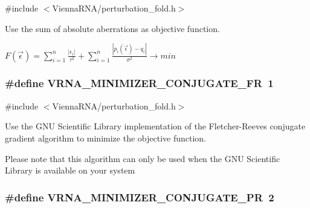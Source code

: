 {\ttfamily \#include $<$Vienna\-R\-N\-A/perturbation\-\_\-fold.\-h$>$}



Use the sum of absolute aberrations as objective function. 

$ F(\vec\epsilon) = \sum_{i = 1}^n{ \frac{|\epsilon_i|}{\tau^2} } + \sum_{i = 1}^n{ \frac{|p_i(\vec\epsilon) - q_i|}{\sigma^2} } \to min $ \hypertarget{group__soft__constraints_gab1d89db58e8c497795a5005f5dbc8c4a}{
\subsubsection[{V\-R\-N\-A\-\_\-\-M\-I\-N\-I\-M\-I\-Z\-E\-R\-\_\-\-C\-O\-N\-J\-U\-G\-A\-T\-E\-\_\-\-F\-R}]{\setlength{\rightskip}{0pt plus 5cm}\#define V\-R\-N\-A\-\_\-\-M\-I\-N\-I\-M\-I\-Z\-E\-R\-\_\-\-C\-O\-N\-J\-U\-G\-A\-T\-E\-\_\-\-F\-R~1}}\label{group__soft__constraints_gab1d89db58e8c497795a5005f5dbc8c4a}


{\ttfamily \#include $<$Vienna\-R\-N\-A/perturbation\-\_\-fold.\-h$>$}



Use the G\-N\-U Scientific Library implementation of the Fletcher-\/\-Reeves conjugate gradient algorithm to minimize the objective function. 

Please note that this algorithm can only be used when the G\-N\-U Scientific Library is available on your system \hypertarget{group__soft__constraints_ga5aaeafe1b0aa77a5cda18943ff94b02f}{
\subsubsection[{V\-R\-N\-A\-\_\-\-M\-I\-N\-I\-M\-I\-Z\-E\-R\-\_\-\-C\-O\-N\-J\-U\-G\-A\-T\-E\-\_\-\-P\-R}]{\setlength{\rightskip}{0pt plus 5cm}\#define V\-R\-N\-A\-\_\-\-M\-I\-N\-I\-M\-I\-Z\-E\-R\-\_\-\-C\-O\-N\-J\-U\-G\-A\-T\-E\-\_\-\-P\-R~2}}\label{group__soft__constraints_ga5aaeafe1b0aa77a5cda18943ff94b02f}


